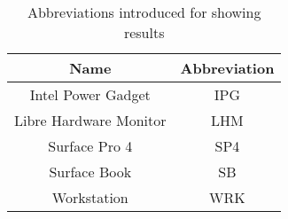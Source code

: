 \begin{table}[ht]
    \centering
    \begin{tabular}{|| c | c ||}
        \hline
        \textbf{Name} & \textbf{Abbreviation} \\ [0.5ex] \hline\hline
        Intel Power Gadget & IPG \\
        Libre Hardware Monitor & LHM \\
        Surface Pro 4 & SP4 \\
        Surface Book & SB \\
        Workstation & WRK \\ \hline
    \end{tabular}
    \caption{Abbreviations introduced for showing results}
    \label{tab:abbreviation}
\end{table}